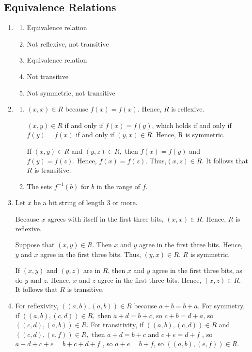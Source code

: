 \documentclass{sig-alternate-05-2015}
\begin{document}
\subsection{Equivalence Relations}
\begin{enumerate}
\item
	\begin{enumerate}
		\item Equivalence relation \item Not reflexive, not transitive
		\item Equivalence relation \item Not transitive \item Not symmetric,
		not transitive
	\end{enumerate}
\item
	\begin{enumerate}
		\item  $(x, x) \in R $ because $f (x) = f (x)$. Hence, $R$ is reflexive.
		
		$(x, y) \in R$ if and only if $f (x) = f (y)$, which holds if and
		only if $f (y) = f (x)$ if and only if $(y, x) \in R.$ Hence, R is
		symmetric. 
		
		If $(x, y) \in R$ and $(y, z) \in R,$ then $f (x) = f (y)$
		and $f (y) = f (z)$. Hence, $f (x) = f (z)$. Thus,$ (x, z) \in R$.
		It follows that $R$ is transitive. 
		\item   The sets $f^{-1}(b)$ for $b$ in the range of $f$.
	\end{enumerate}

\item 
Let $x$ be a bit string of length 3 or more.

Because $x$ agrees with itself in the first three bits, $(x, x)\in R.$
Hence, $R$ is reflexive. 

Suppose that $(x, y) \in R.$ Then $x$ and $y$ agree in the first three bits. 
Hence, $y$ and $x$ agree in the first three bits. Thus, $(y, x)\in R$. $R$ is symmetric.

If $(x, y)$ and $(y, z)$ are in $R$, then
$x$ and $y$ agree in the first three bits, as do $y$ and $z$. Hence, $x$
and $z$ agree in the first three bits. Hence, $(x, z) \in R.$ It follows
that $R$ is transitive.

\item
For reflexivity,
$((a, b), (a, b))\in R$ because $a +b = b +a$. For symmetry, if
$((a, b), (c, d))\in R,$ then $a + d = b + c$, so $c + b = d + a$,
so $((c, d), (a, b))\in R.$ For transitivity, if $((a, b), (c, d)) \in R$
 and $((c, d), (e, f )) \in R,$ then $a+d = b+c$ and $c+e = d+f$ ,
so $a + d + c + e = b + c + d + f$ , so $a + e = b + f $,
so $((a, b), (e, f ))\in R.$ 


\end{enumerate}
\end{document}
